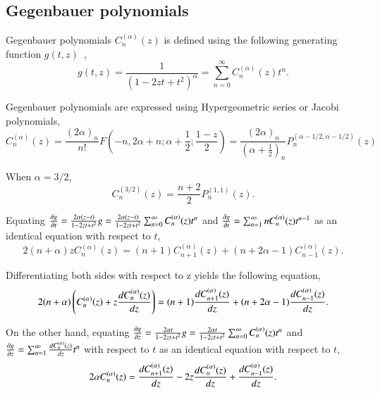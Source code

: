 \documentclass{article}
\begin{document}
\subsection{Gegenbauer polynomials}
Gegenbauer polynomials $C^{(\alpha)}_{n} (z)$ is defined using the following generating function $g(t,z)$~\cite{olver2010nist},
\begin{equation}
 g(t,z) = \frac{1}{\left(1 - 2zt + t^2\right)^\alpha} = \sum_{n=0}^{\infty} C^{(\alpha)}_{n} (z) t^n.\label{gegen_def}
\end{equation}

Gegenbauer polynomials are expressed using Hypergeometric series or Jacobi polynomials,
\begin{equation}
 C^{(\alpha)}_{n} (z) = \frac{(2\alpha)_n}{n!} F \left(-n, 2\alpha + n; \alpha+\frac{1}{2}; \frac{1-z}{2}\right) = \frac{(2\alpha)_n}{\left(\alpha + \frac{1}{2}\right)_n} P^{(\alpha - 1/2,\alpha - 1/2)}_{n} (z)
\end{equation}

When $\alpha=3/2$,
\begin{equation}
 C^{(3/2)}_{n} (z) = \frac{n+2}{2} P^{(1,1)}_{n} (z).
\end{equation}

Equating $\frac{\partial {g}}{\partial {t}} = \frac{2\alpha (z-t)}{1 - 2zt + t^2} g = \frac{2\alpha (z-t)}{1 - 2zt + t^2} \sum_{n=0}^{\infty} C^{(\alpha)}_{n} (z) t^n$ and
$\frac{\partial {g}}{\partial {t}} = \sum_{n=1}^{\infty} nC^{(\alpha)}_{n} (z) t^{n-1}$ as an identical equation with respect to $t$,
\begin{equation}
 2(n+\alpha)z C^{(\alpha)}_{n} (z) = (n+1) C^{(\alpha)}_{n+1}(z) + (n+2\alpha - 1) C^{(\alpha)}_{n-1}(z).
\end{equation}

Differentiating both sides with respect to z yields the following equation,
\begin{equation}
 2(n+\alpha) \left( C^{(\alpha)}_{n} (z) +  z \frac{d {C^{(\alpha)}_{n} (z)}}{d {z}} \right) = (n+1) \frac{d {C^{(\alpha)}_{n+1}(z)}}{d {z}} + (n+2\alpha - 1) \frac{d {C^{(\alpha)}_{n-1}(z)}}{d {z}}.\label{gegen_dg_dt}
\end{equation}

On the other hand, equating $\frac{\partial {g}}{\partial {z}} = \frac{2\alpha t}{1-2zt+t^2} g = \frac{2\alpha t}{1-2zt+t^2} \sum_{n=0}^{\infty} C^{(\alpha)}_{n} (z) t^n$ and
$\frac{\partial {g}}{\partial {z}} = \sum_{n=1}^{\infty} \frac{d {C^{(\alpha)}_{n} (z)}}{d {z}} t^{n}$ with respect to $t$ as an identical equation with respect to $t$,
\begin{equation}
 2\alpha C^{(\alpha)}_{n} (z) = \frac{d {C^{(\alpha)}_{n+1} (z)}}{d {z}} - 2z \frac{d {C^{(\alpha)}_{n} (z)}}{d {z}} + \frac{d {C^{(\alpha)}_{n-1} (z)}}{d {z}}.\label{gegen_dg_dz}
\end{equation}
\end{document}
